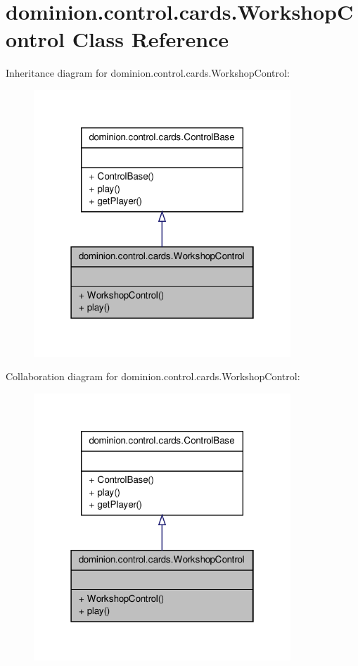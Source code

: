 \hypertarget{classdominion_1_1control_1_1cards_1_1WorkshopControl}{\section{dominion.\-control.\-cards.\-Workshop\-Control \-Class \-Reference}
\label{classdominion_1_1control_1_1cards_1_1WorkshopControl}
}


\-Inheritance diagram for dominion.\-control.\-cards.\-Workshop\-Control\-:
\nopagebreak
\begin{figure}[H]
\begin{center}
\leavevmode
\includegraphics[width=274pt]{classdominion_1_1control_1_1cards_1_1WorkshopControl__inherit__graph}
\end{center}
\end{figure}


\-Collaboration diagram for dominion.\-control.\-cards.\-Workshop\-Control\-:
\nopagebreak
\begin{figure}[H]
\begin{center}
\leavevmode
\includegraphics[width=274pt]{classdominion_1_1control_1_1cards_1_1WorkshopControl__coll__graph}
\end{center}
\end{figure}
